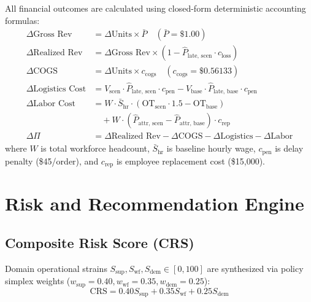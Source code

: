 \documentclass[10pt,conference]{IEEEtran}
\begin{document}
All financial outcomes are calculated using closed-form deterministic accounting formulas:
\begin{align}
\Delta \text{Gross Rev} &= \Delta \text{Units} \times \bar{P} \quad (\bar{P} = \$1.00) \\
\Delta \text{Realized Rev} &= \Delta \text{Gross Rev} \times (1 - \hat{P}_{\text{late, scen}} \cdot c_{\text{loss}}) \\
\Delta \text{COGS} &= \Delta \text{Units} \times c_{\text{cogs}} \quad (c_{\text{cogs}} = \$0.56133) \\
\Delta \text{Logistics Cost} &= V_{\text{scen}} \cdot \hat{P}_{\text{late, scen}} \cdot c_{\text{pen}} - V_{\text{base}} \cdot \hat{P}_{\text{late, base}} \cdot c_{\text{pen}} \\
\Delta \text{Labor Cost} &= W \cdot \bar{S}_{\text{hr}} \cdot (\text{OT}_{\text{scen}} \cdot 1.5 - \text{OT}_{\text{base}}) \nonumber \\
&\quad + W \cdot (\hat{P}_{\text{attr, scen}} - \hat{P}_{\text{attr, base}}) \cdot c_{\text{rep}} \\
\Delta \Pi &= \Delta \text{Realized Rev} - \Delta \text{COGS} - \Delta \text{Logistics} - \Delta \text{Labor}
\end{align}
where $W$ is total workforce headcount, $\bar{S}_{\text{hr}}$ is baseline hourly wage, $c_{\text{pen}}$ is delay penalty (\$45/order), and $c_{\text{rep}}$ is employee replacement cost (\$15,000).

\section{Risk and Recommendation Engine}

\subsection{Composite Risk Score (CRS)}
Domain operational strains $S_{\text{sup}}, S_{\text{wf}}, S_{\text{dem}} \in [0, 100]$ are synthesized via policy simplex weights ($w_{\text{sup}}=0.40, w_{\text{wf}}=0.35, w_{\text{dem}}=0.25$):
\begin{equation}
\text{CRS} = 0.40 S_{\text{sup}} + 0.35 S_{\text{wf}} + 0.25 S_{\text{dem}}
\end{equation}
\end{document}
